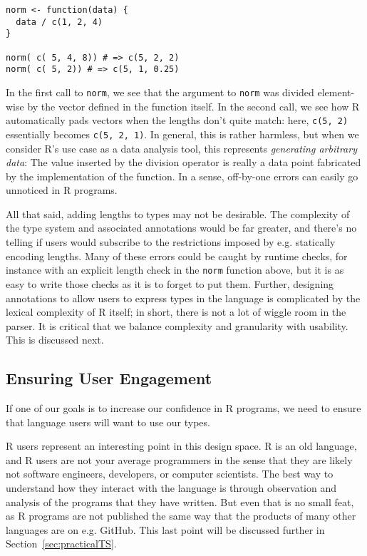 \documentclass[sigplan,10pt,review,anonymous]{acmart}\settopmatter{printfolios=true,printccs=false,printacmref=false}
\begin{document}
\begin{lstlisting}
norm <- function(data) {
  data / c(1, 2, 4)
}

norm( c( 5, 4, 8)) # => c(5, 2, 2)
norm( c( 5, 2)) # => c(5, 1, 0.25)
\end{lstlisting}

In the first call to {\tt norm}, we see that the argument to {\tt norm} was divided element-wise by the vector defined in the function itself.
In the second call, we see how R automatically pads vectors when the lengths don't quite match: here, {\tt c(5, 2)} essentially becomes {\tt c(5, 2, 1)}.
In general, this is rather harmless, but when we consider R's use case as a data analysis tool, this represents {\it generating arbitrary data}: 
The value inserted by the division operator is really a data point fabricated by the implementation of the function.
In a sense, off-by-one errors can easily go unnoticed in R programs.

All that said, adding lengths to types may not be desirable.
The complexity of the type system and associated annotations would be far greater, and there's no telling if users would subscribe to the restrictions imposed by e.g. statically encoding lengths.
Many of these errors could be caught by runtime checks, for instance with an explicit length check in the {\tt norm} function above, but it is as easy to write those checks as it is to forget to put them.
Further, designing annotations to allow users to express types in the language is complicated by the lexical complexity of R itself; in short, there is not a lot of wiggle room in the parser.
It is critical that we balance complexity and granularity with usability.
This is discussed next.

%
%
\subsection{Ensuring User Engagement}

If one of our goals is to increase our confidence in R programs, we need to ensure that language users will want to use our types.

R users represent an interesting point in this design space.
R is an old language, and R users are not your average programmers in the sense that they are likely not software engineers, developers, or computer scientists.
The best way to understand how they interact with the language is through observation and analysis of the programs that they have written.
But even that is no small feat, as R programs are not published the same way that the products of many other languages are on e.g. GitHub.
This last point will be discussed further in Section~\ref{sec:practicalTS}.
\end{document}
